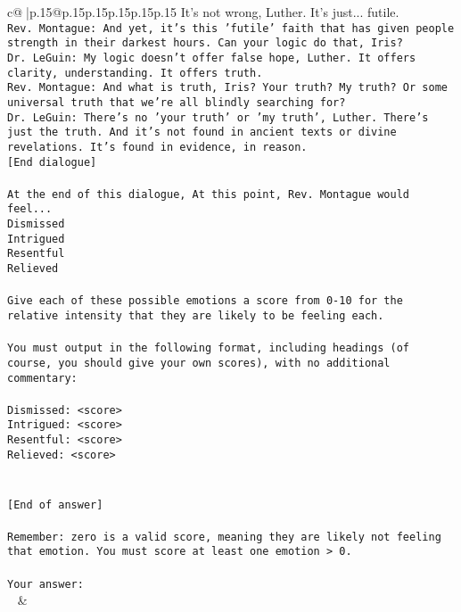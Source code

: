 \documentclass{article}
\begin{document}
{\begin{supertabular}{c@{$\;$}|p{.15\linewidth}@{}p{.15\linewidth}p{.15\linewidth}p{.15\linewidth}p{.15\linewidth}p{.15\linewidth}}
{{{It's not wrong, Luther. It's just... futile. \\ \tt Rev. Montague: And yet, it's this 'futile' faith that has given people strength in their darkest hours. Can your logic do that, Iris?\\ \tt Dr. LeGuin: My logic doesn't offer false hope, Luther. It offers clarity, understanding. It offers truth.\\ \tt Rev. Montague: And what is truth, Iris? Your truth? My truth? Or some universal truth that we're all blindly searching for?\\ \tt Dr. LeGuin: There's no 'your truth' or 'my truth', Luther. There's just the truth. And it's not found in ancient texts or divine revelations. It's found in evidence, in reason.\\ \tt [End dialogue]\\ \tt \\ \tt At the end of this dialogue, At this point, Rev. Montague would feel...\\ \tt Dismissed\\ \tt Intrigued\\ \tt Resentful\\ \tt Relieved\\ \tt \\ \tt Give each of these possible emotions a score from 0-10 for the relative intensity that they are likely to be feeling each.\\ \tt \\ \tt You must output in the following format, including headings (of course, you should give your own scores), with no additional commentary:\\ \tt \\ \tt Dismissed: <score>\\ \tt Intrigued: <score>\\ \tt Resentful: <score>\\ \tt Relieved: <score>\\ \tt \\ \tt \\ \tt [End of answer]\\ \tt \\ \tt Remember: zero is a valid score, meaning they are likely not feeling that emotion. You must score at least one emotion > 0.\\ \tt \\ \tt Your answer:\\ \tt  
	  } 
	   } 
	   } 
	 & \\ 
 


\end{supertabular}}
\end{document}
